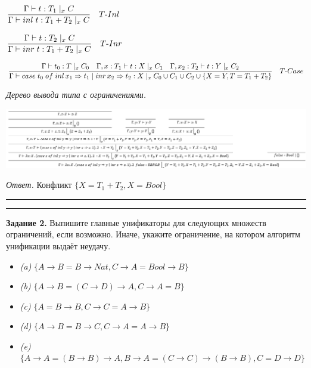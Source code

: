 \documentclass[landscape, 11pt]{report}
\begin{document}
	$\dfrac{\Gamma \vdash t : T_1 \; |_{x} \; C}{\Gamma \vdash inl \; t : T_1 + T_2 \; |_x \; C} \quad T\textup{-}Inl$

	\vspace{0.15cm}
	
	$\dfrac{\Gamma \vdash t : T_2 \; |_{x} \; C}{\Gamma \vdash inr \; t : T_1 + T_2 \; |_x \; C} \quad T\textup{-}Inr$

	\vspace{0.15cm}

	$\dfrac{\Gamma \vdash t_0 : T \; |_{x} \; C_0 \quad \Gamma, x : T_1 \vdash t : X \; |_x \; C_1 \quad \Gamma, x_2 : T_2 \vdash t : Y \; |_x \; C_2}{\Gamma \vdash case \; t_0 \; of \; inl \, x_1 \Rightarrow t_1 \; | \; inr \, x_2 \Rightarrow t_2 : X \; |_x \; C_0 \cup C_1 \cup C_2 \cup \{X = Y, T = T_1 + T_2\}} \quad T\textup{-}Case$
	
	\vspace{0.25cm}
	
	\textit{Дерево вывода типа с ограничениями.}
	
	\begin{center}
		\includegraphics[scale=0.45]{solution}
	\end{center}
	
	\textit{Ответ.} Конфликт $\{X = T_1 + T_2, X = Bool\}$
	
	\vspace{0.1cm}
	\hrule
	
	\newpage
	
	
	\hrule
	\vspace{0.5cm}
	
	\textbf{Задание 2.} Выпишите главные унификаторы для следующих множеств ограничений, если возможно. Иначе, укажите ограничение, на котором алгоритм унификации выдаёт неудачу.
	
	\begin{itemize}
		\item[] \textit{(a)} $\{A \rightarrow B = B \rightarrow Nat, C \rightarrow A = Bool \rightarrow B\}$
		\item[] \textit{(b)} $\{A \rightarrow B = (C \rightarrow D) \rightarrow A, C \rightarrow A = B\}$
		\item[] \textit{(c)} $\{A = B \rightarrow B, C \rightarrow C = A \rightarrow B\}$
		\item[] \textit{(d)} $\{A \rightarrow B = B \rightarrow C, C \rightarrow A = A \rightarrow B\}$
		\item[] \textit{(e)} $\{A \rightarrow A = (B \rightarrow B) \rightarrow A, B \rightarrow A = (C \rightarrow C) \rightarrow (B \rightarrow B), C = D \rightarrow D\}$
	\end{itemize}
	
\end{document}
